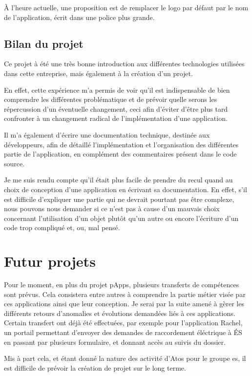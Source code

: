 \documentclass[12pt]{report}
\begin{document}
    À l'heure actuelle, une proposition est de remplacer le logo par défaut par le nom de l'application, écrit dans une police plus grande.
    
    \subsection{Bilan du projet}
    
    Ce projet à été une très bonne introduction aux différentes technologies utilisées dans cette entreprise, mais également à la création d'un projet.
    
    En effet, cette expérience m'a permis de voir qu'il est indispensable de bien comprendre les différentes problématique et de prévoir quelle serons les répercussion d'un éventuelle changement, ceci afin d'éviter d'être plus tard confronter à un changement radical de l'implémentation d'une application.
    
    Il m'a également d'écrire une documentation technique, destinée aux développeurs, afin de détaillé l'implémentation et l'organisation des différentes partie de l'application, en complément des commentaires présent dans le code source.
    
    Je me suis rendu compte qu'il était plus facile de prendre du recul quand au choix de conception d'une application en écrivant sa documentation. En effet, s'il est difficile d'expliquer une partie qui ne devrait pourtant pas être complexe, nous pouvons nous demander si ce n'est pas à cause d'un mauvais choix concernant l'utilisation d'un objet plutôt qu'un autre ou encore l'écriture d'un code trop compliqué et, ou, mal pensé.

    \section{Futur projets}
    Pour le moment, en plus du projet pApps, plusieurs transferts de compétences sont prévus. Cela consistera entre autres à comprendre la partie métier visée par ces applications ainsi que leur conception. Je serai par la suite amené à gèrer les différents retours d'anomalies et évolutions demandées liés à ces applications. Certain transfert ont déjà été effectuées, par exemple pour l'application Rachel, un portail permettant d'envoyer des demandes de raccordement éléctrique à ÉS en passant par plusieurs formulaire, et donnant accès au suivis du dossier.
    
    Mis à part cela, et étant donné la nature des activité d'Atos pour le groupe \acrshort{es}, il est difficile de prévoir la création de projet sur le long terme.
    
\end{document}

